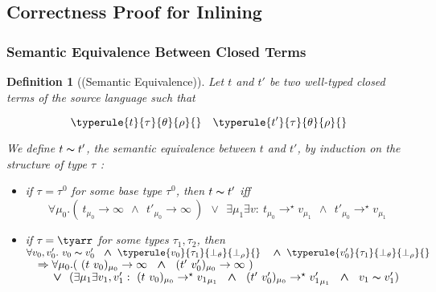 \documentclass[a4paper,11pt,oneside]{article}
\theoremstyle{plain}
\newtheorem{definition}{Definition}[subsection]
\newcommand{\tmapp}[2]{(#1 ~ #2)}
\newcommand{\ty}[1][]{\tau_{#1}}
\newcommand{\bwedge}{\boldsymbol{~\wedge~}}
\newcommand{\bvee}{\boldsymbol{~\vee~}}
\newcommand{\bth}{\bot_\theta}
\newcommand{\brh}{\bot_\rho}
\newcommand{\evalstar}[4]{~#1_{\mu_#2} \rightarrow^{\star} #3_{\mu_#4} ~}
\newcommand{\evalinfty}[2]{~#1_{#2} \rightarrow \infty ~}
\newcommand{\eqv}[1]{#1 \thicksim #1'}
\begin{document}
 
	


\subsection{Correctness Proof for Inlining}

\subsubsection*{Semantic Equivalence Between Closed Terms}

\label{semantic equivalence}
\begin{definition}[(Semantic Equivalence)]
	Let $t$ and $t'$ be two well-typed closed terms of the source 
	language such that 
	
	$$
		\typerule{t}{\tau}{\theta}{\rho}{} \quad \typerule{t'}{\tau}{\theta}{\rho}{} 
	$$

	We define $\eqv{t}$, the \textit{semantic equivalence} between $t$ and $t'$, 
	by induction on the structure of type $\ty$ :
	
	\begin{itemize}
		\item[$(\alpha)$]

			if $\ty{} = \ty{}^0$ for some base type $\ty{}^0$, then $\eqv{t}$ iff
			$$	\forall \mu_0.(\evalinfty{t}{\mu_0} \bwedge \evalinfty{t'}{\mu_0})~
					\bvee ~ \exists \mu_1 \exists v: 
					\evalstar{t}{0}{v}{1} \bwedge \evalstar{t'}{0}{v}{1} $$
		
		\item[$(\beta)$]
			if $\ty = \tyarr$ for some types $\ty[1], \ty[2]$,
			then\\[0.2cm]
			$\hspace*{0em}\forall v_0, v'_0. ~ \eqv{v_0} ~ 
			\bwedge \typerule{v_0}{\ty[1]}{\bth}{\brh}{} ~~
			\bwedge \typerule{v'_0}{\ty[1]}{\bth}{\brh}{} $ \\[0.2cm]
			$\hspace*{1em}
			\Rightarrow \forall\mu_0.(\evalinfty{\tmapp{t}{v_0}}{\mu_0}
			\bwedge\evalinfty{\tmapp{t'}{v'_0}}{\mu_0})$\\[0.2cm]
			$\hspace*{2em}\bvee~(\exists \mu_1 \exists v_1, v'_1 : 
			 	\evalstar{\tmapp{t}{v_0}}{0}{{v_1}}{1} 
				\bwedge \evalstar{\tmapp{t'}{v'_0}}{0}{{v'_1}}{1}
				\bwedge~\eqv{v_1})$				
	\end{itemize}
	\end{definition}
\end{document}
